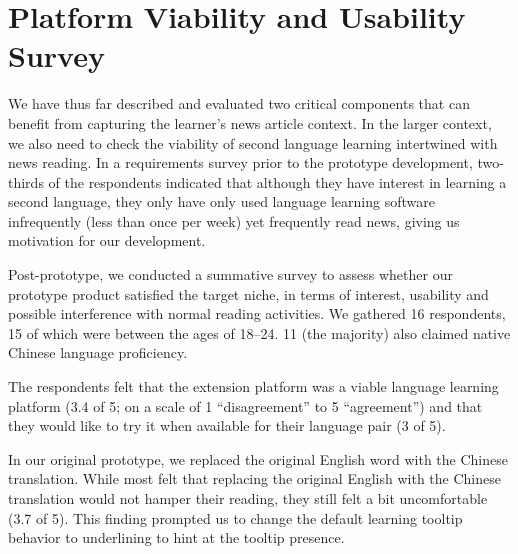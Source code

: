 \section{Platform Viability and Usability Survey}

We have thus far described and evaluated two critical components that
can benefit from capturing the learner's news article context.  In the
larger context, we also need to check the viability of second language
learning intertwined with news reading.  In a requirements survey
prior to the prototype development, two-thirds of the respondents
indicated that although they have interest in learning a second
language, they only have only used language learning software
infrequently (less than once per week) yet frequently read news,
giving us motivation for our development.

Post-prototype, we conducted a summative survey to assess whether our
prototype product satisfied the target niche, in terms of interest,
usability and possible interference with normal reading activities.
We gathered 16 respondents, 15 of which were between the ages of
18--24.  11 (the majority) also claimed native Chinese language
proficiency.  

The respondents felt that the extension platform was a viable language
learning platform (3.4 of 5; on a scale of 1 ``disagreement'' to 
5 ``agreement'') and that they would like to try it when available
for their language pair (3 of 5).

In our original prototype, we replaced the original English word with
the Chinese translation.  While most felt that replacing the original
English with the Chinese translation would not hamper their reading,
they still felt a bit uncomfortable (3.7 of 5).  This finding prompted
us to change the default learning tooltip behavior to underlining to
hint at the tooltip presence.
